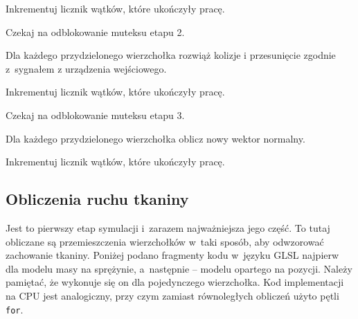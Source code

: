 \begin{algorithm}[H]
{				Inkrementuj licznik wątków, które ukończyły pracę.
				
				Czekaj na odblokowanie muteksu etapu 2.
				
				Dla każdego przydzielonego wierzchołka rozwiąż kolizje i przesunięcie zgodnie z~sygnałem z urządzenia wejściowego.
				
				Inkrementuj licznik wątków, które ukończyły pracę.
				
				Czekaj na odblokowanie muteksu etapu 3.
				
				Dla każdego przydzielonego wierzchołka oblicz nowy wektor normalny.
				
				Inkrementuj licznik wątków, które ukończyły pracę.
			}
			
			\Indm
		\end{algorithm}
			
		\subsection{Obliczenia ruchu tkaniny}
		\label{t:symulacja:dzialanie:ruch}
			
		
		Jest to pierwszy etap symulacji i~zarazem najważniejsza jego część. To tutaj obliczane są przemieszczenia wierzchołków w~taki sposób, aby odwzorować zachowanie tkaniny. Poniżej podano fragmenty kodu w~języku GLSL najpierw dla modelu masy na sprężynie, a~następnie -- modelu opartego na pozycji. Należy pamiętać, że wykonuje się on dla pojedynczego wierzchołka. Kod implementacji na CPU jest analogiczny, przy czym zamiast równoległych obliczeń użyto pętli \texttt{for}.
		\newline	
		
